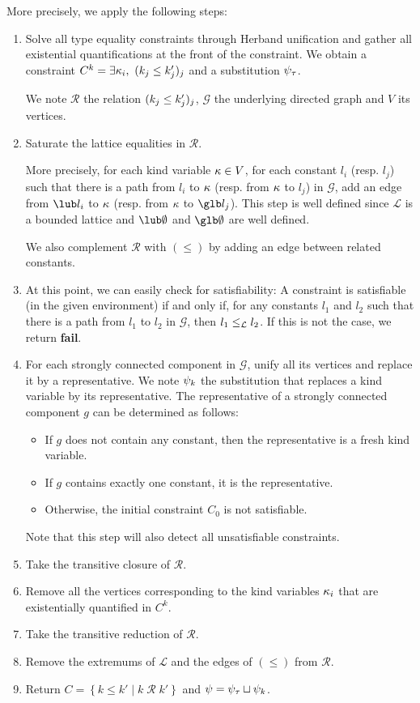More precisely, we apply the following steps:
\begin{enumerate}
\item Solve all type equality constraints through Herband unification and
  gather all existential quantifications at the front of the constraint.
  We obtain a constraint $C^k = \exists \kappa_i,\ (k_j \leq k'_j)_j$ and
  a substitution $\mathrm{\psi}_\tau$.

  We note $\mathcal R$ the relation $(k_j \leq k'_j)_j$,
  $\mathcal G$ the underlying directed graph and $V$ its vertices.

\item Saturate the lattice equalities in $\mathcal R$.

  More precisely, for each kind variable $\kappa \in V$,
  for each constant $l_i$ (resp. $l_j$) such that
  there is a path from $l_i$ to $\kappa$ (resp. from $\kappa$ to $l_j$) in $\mathcal G$,
  add an edge from $\lub l_i$ to $\kappa$
  (resp. from $\kappa$ to $\glb l_j$).
  This step is well defined since $\mathcal L$ is a bounded lattice
  and $\lub\emptyset$ and $\glb\emptyset$ are well defined.

  We also complement $\mathcal R$ with $(\leq)$ by adding an edge
  between related constants.
\item
  At this point, we can easily check for satisfiability: A constraint
  is satisfiable (in the given environment) if and only if,
  for any constants $l_1$ and $l_2$ such that
  there is a path from $l_1$ to $l_2$ in $\mathcal G$, then $l_1\leq_\mathcal L l_2$.
  If this is not the case, we return \textbf{fail}.

\item For each strongly connected component in $\mathcal G$, unify all its vertices and replace it by a representative.
  We note $\mathrm{\psi}_k$ the substitution that replaces a kind variable by
  its representative.
  The representative of a strongly connected component $g$ can be determined as follows:
  \begin{itemize}
  \item If $g$ does not contain any constant, then the representative
    is a fresh kind variable.
  \item If $g$ contains exactly one constant, it is the representative.
  \item Otherwise, the initial constraint $C_0$ is not satisfiable.
  \end{itemize}
  Note that this step will also detect all unsatisfiable constraints.
\item Take the transitive closure of $\mathcal R$.
\item Remove all the vertices corresponding to the kind variables $\kappa_i$
  that are existentially quantified in $C^k$.
\item Take the transitive reduction of $\mathcal R$.
\item Remove the extremums of $\mathcal L$ and the edges of $(\leq)$
  from $\mathcal R$.
\item Return $C = \left\{ k \leq k' \mid k \operatorname{\mathcal R}k' \right\}$
  and $\mathrm{\psi} =  \mathrm{\psi}_\tau \sqcup \mathrm{\psi}_k$.
\end{enumerate}

